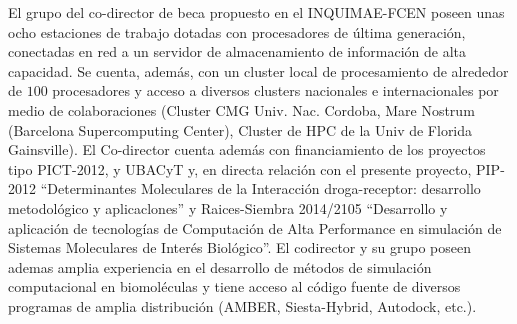 \documentclass[a4paper,10pt]{article}
\begin{document}
El grupo del co-director de beca propuesto en el INQUIMAE-FCEN poseen unas ocho estaciones de trabajo dotadas con procesadores de \'ultima generaci\'on, conectadas en red a un servidor de almacenamiento de informaci\'on de alta capacidad. 
Se cuenta, adem\'as, con un cluster local de procesamiento de alrededor de $100$ procesadores y acceso a diversos clusters nacionales e internacionales por medio de colaboraciones (Cluster CMG Univ. Nac. Cordoba, Mare Nostrum (Barcelona Supercomputing Center), Cluster de HPC de la Univ de Florida Gainsville). 
El Co-director cuenta adem\'as con financiamiento de los proyectos tipo PICT-2012, y UBACyT y, en directa relaci\'on con el presente proyecto, PIP-2012 ``Determinantes Moleculares de la Interacci\'on droga-receptor: desarrollo metodol\'ogico y aplicaclones'' y Raices-Siembra 2014/2105 ``Desarrollo y aplicaci\'on de tecnolog\'ias de Computaci\'on de Alta Performance en simulaci\'on de Sistemas Moleculares de Inter\'es Biol\'ogico''. 
El codirector y su grupo poseen ademas amplia experiencia en el desarrollo de m\'etodos de simulaci\'on computacional en biomol\'eculas y tiene acceso al c\'odigo fuente de diversos programas de amplia distribuci\'on (AMBER, Siesta-Hybrid, Autodock, etc.).


\footnotesize 

\end{document}
